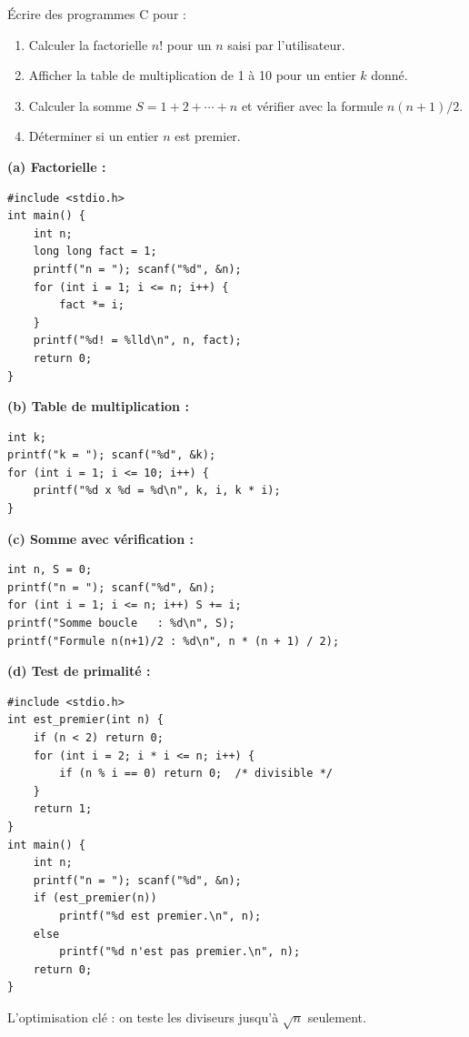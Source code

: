 \documentclass[12pt,a4paper]{article}
\begin{document}
\begin{boiteexercice}
Écrire des programmes C pour :
\begin{enumerate}[label=(\alph*)]
  \item Calculer la factorielle $n!$ pour un $n$ saisi par l'utilisateur.
  \item Afficher la table de multiplication de 1 à 10 pour un entier $k$ donné.
  \item Calculer la somme $S = 1 + 2 + \cdots + n$ et vérifier avec la formule $n(n+1)/2$.
  \item Déterminer si un entier $n$ est premier.
\end{enumerate}
\end{boiteexercice}

\begin{boitecorrige}
\textbf{(a) Factorielle :}
\begin{lstlisting}
#include <stdio.h>
int main() {
    int n;
    long long fact = 1;
    printf("n = "); scanf("%d", &n);
    for (int i = 1; i <= n; i++) {
        fact *= i;
    }
    printf("%d! = %lld\n", n, fact);
    return 0;
}
\end{lstlisting}

\textbf{(b) Table de multiplication :}
\begin{lstlisting}
int k;
printf("k = "); scanf("%d", &k);
for (int i = 1; i <= 10; i++) {
    printf("%d x %d = %d\n", k, i, k * i);
}
\end{lstlisting}

\textbf{(c) Somme avec vérification :}
\begin{lstlisting}
int n, S = 0;
printf("n = "); scanf("%d", &n);
for (int i = 1; i <= n; i++) S += i;
printf("Somme boucle   : %d\n", S);
printf("Formule n(n+1)/2 : %d\n", n * (n + 1) / 2);
\end{lstlisting}

\textbf{(d) Test de primalité :}
\begin{lstlisting}
#include <stdio.h>
int est_premier(int n) {
    if (n < 2) return 0;
    for (int i = 2; i * i <= n; i++) {
        if (n % i == 0) return 0;  /* divisible */
    }
    return 1;
}
int main() {
    int n;
    printf("n = "); scanf("%d", &n);
    if (est_premier(n))
        printf("%d est premier.\n", n);
    else
        printf("%d n'est pas premier.\n", n);
    return 0;
}
\end{lstlisting}
L'optimisation clé : on teste les diviseurs jusqu'à $\sqrt{n}$ seulement.
\end{boitecorrige}
\end{document}
